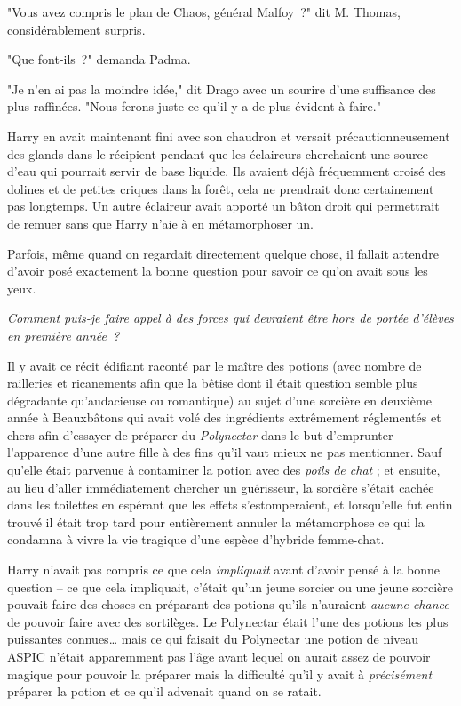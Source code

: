 "Vous avez compris le plan de Chaos, général Malfoy~?" dit M. Thomas, considérablement surpris.

"Que font-ils~?" demanda Padma.

"Je n'en ai pas la moindre idée," dit Drago avec un sourire d'une suffisance des plus raffinées. "Nous ferons juste ce qu'il y a de plus évident à faire."

\later

Harry en avait maintenant fini avec son chaudron et versait précautionneusement des glands dans le récipient pendant que les éclaireurs cherchaient une source d'eau qui pourrait servir de base liquide. Ils avaient déjà fréquemment croisé des dolines et de petites criques dans la forêt, cela ne prendrait donc certainement pas longtemps. Un autre éclaireur avait apporté un bâton droit qui permettrait de remuer sans que Harry n'aie à en métamorphoser un.

Parfois, même quand on regardait directement quelque chose, il fallait attendre d'avoir posé exactement la bonne question pour savoir ce qu'on avait sous les yeux.

\emph{Comment puis-je faire appel à des forces qui devraient être hors de portée d'élèves en première année~?}

Il y avait ce récit édifiant raconté par le maître des potions (avec nombre de railleries et ricanements afin que la bêtise dont il était question semble plus dégradante qu'audacieuse ou romantique) au sujet d'une sorcière en deuxième année à Beauxbâtons qui avait volé des ingrédients extrêmement réglementés et chers afin d'essayer de préparer du \emph{Polynectar} dans le but d'emprunter l'apparence d'une autre fille à des fins qu'il vaut mieux ne pas mentionner. Sauf qu'elle était parvenue à contaminer la potion avec des \emph{poils de chat} ; et ensuite, au lieu d'aller immédiatement chercher un guérisseur, la sorcière s'était cachée dans les toilettes en espérant que les effets s'estomperaient, et lorsqu'elle fut enfin trouvé il était trop tard pour entièrement annuler la métamorphose ce qui la condamna à vivre la vie tragique d'une espèce d'hybride femme-chat.

Harry n'avait pas compris ce que cela \emph{impliquait} avant d'avoir pensé à la bonne question -- ce que cela impliquait, c'était qu'un jeune sorcier ou une jeune sorcière pouvait faire des choses en préparant des potions qu'ils n'auraient \emph{aucune chance} de pouvoir faire avec des sortilèges. Le Polynectar était l'une des potions les plus puissantes connues… mais ce qui faisait du Polynectar une potion de niveau ASPIC n'était apparemment pas l'âge avant lequel on aurait assez de pouvoir magique pour pouvoir la préparer mais la difficulté qu'il y avait à \emph{précisément} préparer la potion et ce qu'il advenait quand on se ratait.

